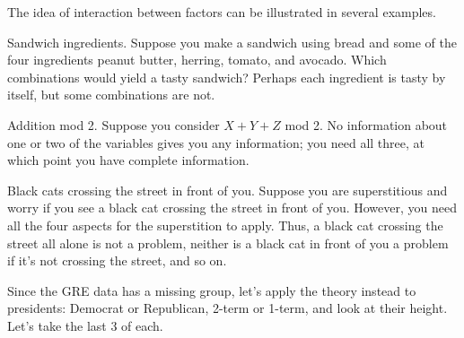 The idea of interaction between factors can be illustrated in several examples.
\begin{example}{Sandwich ingredients.}
Suppose you make a sandwich using bread and some of the four ingredients peanut butter, herring, tomato, and avocado. Which combinations would yield a tasty sandwich? Perhaps each ingredient is tasty by itself, but some combinations are not.
\end{example}

\begin{example}{Addition mod 2.}
Suppose you consider $X+Y+Z$ mod 2. No information about one or two of the variables gives you any information; you need all three, at which point you have complete information.
\end{example}

\begin{example}{Black cats crossing the street in front of you.}
Suppose you are superstitious and worry if you see a black cat crossing the street in front of you. However, you need all the four aspects for the superstition to apply. Thus, a black cat crossing the street all alone is not a problem, neither is a black cat in front of you a problem if it's not crossing the street, and so on.
\end{example}


Since the GRE data has a missing group, let's apply the theory instead to presidents: Democrat or Republican, 2-term or 1-term, and look at their height.
Let's take the last 3 of each.

